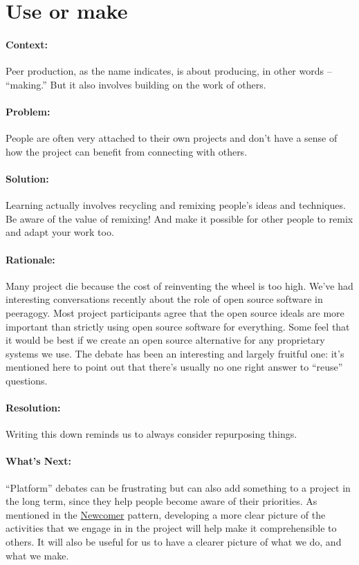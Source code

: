 \section{Use or make}
\paragraph{Context:}
Peer production, as the name indicates, is about producing, in other words --
``making.'' But it also involves building on the work of others.

\paragraph{Problem:}
People are often very attached to their own projects and don't have a sense of how the project can benefit from connecting with others.

\paragraph{Solution:} Learning actually involves recycling and remixing people's ideas and techniques. Be aware of the value of remixing!  And make it possible for other people to remix and adapt your work too.

\paragraph{Rationale:} 
Many project die because the cost of reinventing the wheel is too high.
We've had interesting conversations recently about
the role of open source software in peeragogy. Most project participants
agree that the open source ideals are more important than strictly using
open source software for everything. Some feel that it would be best if
we create an open source alternative for any proprietary systems we use.
The debate has been an interesting and largely fruitful one: it's
mentioned here to point out that there's usually no one right answer to
``reuse'' questions.

\paragraph{Resolution:} Writing this down reminds us to always consider repurposing things.

\paragraph{What's Next:} ``Platform'' debates can be frustrating but can
also add something to a project in the long term, since they help people
become aware of their priorities. As mentioned in
the \href{http://peeragogy.org/patterns/newcomer/}{Newcomer} pattern,
developing a more clear picture of the activities that we engage in in
the project will help make it comprehensible to others. It will also be
useful for us to have a clearer picture of what we do, and what we make.

